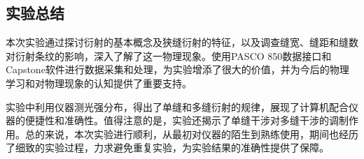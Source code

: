 \documentclass[a4paper]{../phyreport}
\begin{document}
\subsection{实验总结}

本次实验通过探讨衍射的基本概念及狭缝衍射的特征，以及调查缝宽、缝距和缝数对衍射条纹的影响，深入了解了这一物理现象。使用PASCO 850数据接口和Capstone软件进行数据采集和处理，为实验增添了很大的价值，并为今后的物理学习和对物理现象的认知提供了重要支持。

实验中利用仪器测光强分布，得出了单缝和多缝衍射的规律，展现了计算机配合仪器的便捷性和准确性。值得注意的是，实验还揭示了单缝干涉对多缝干涉的调制作用。总的来说，本次实验进行顺利，从最初对仪器的陌生到熟练使用，期间也经历了细致的实验过程，力求避免重复实验，为实验结果的准确性提供了保障。

\endBox
\end{document}
